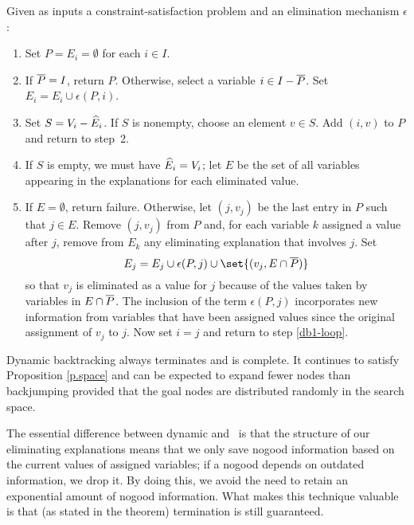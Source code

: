 \begin{algorithm} Given as inputs a
constraint-satisfaction problem and an elimination mechanism
$\epsilon$:
 \begin{enumerate} 
 \item Set $P=E_i=\emptyset$ for each $i\in I$.
 \item If $\overline P=I$, return $P$.  Otherwise, select a variable $i\in
I-\overline P$.  Set $E_i=E_i\cup\epsilon(P,i)$.
 \item Set $S=V_i-\widehat E_i$.  If $S$ is nonempty, choose an element
$v\in S$.  Add $(i,v)$ to $P$ and return to step~2.  \label{db1-loop}
 \item If $S$ is empty, we must have $\widehat E_i=V_i$; let $E$ be the set
of all variables appearing in the explanations for each eliminated
value.
 \item If $E=\emptyset$, return failure.  Otherwise, let $(j,v_j)$ be
the last entry in $P$ such that $j\in E$.  Remove $(j,v_j)$ from $P$
and, for each variable $k$ assigned a value after $j$, remove from
$E_k$ any eliminating explanation that involves $j$.  Set
 \begin{equation}
E_j=E_j \cup \epsilon(P,j) \cup\set{(v_j,E\cap\Pbar)}
 \label{e.new-eliminate}
 \end{equation}
 so that $v_j$ is eliminated as a value for $j$ because of the values
taken by variables in $E\cap\overline P$.  The inclusion of the term
$\epsilon(P,j)$ incorporates new information from variables that have
been assigned values since the original assignment of $v_j$ to $j$.
Now set $i=j$ and return to step \ref{db1-loop}.
\label{db1-backtrack}
 \end{enumerate}
 \label{a.db1}
 \end{algorithm}

\begin{theorem} Dynamic backtracking always terminates and is
complete.  It continues to satisfy Proposition \ref{p.space} and can
be expected to expand fewer nodes than backjumping provided that the
goal nodes are distributed randomly in the search space.
 \label{old.7}
 \label{t.db1}
 \end{theorem}

The essential difference between dynamic and \ddb\ is that the
structure of our eliminating explanations means that we only save
nogood information based on the current values of assigned variables;
if a nogood depends on outdated information, we drop it.  By doing
this, we avoid the need to retain an exponential amount of nogood
information.  What makes this technique valuable is that (as stated in
the theorem) termination is still guaranteed.

